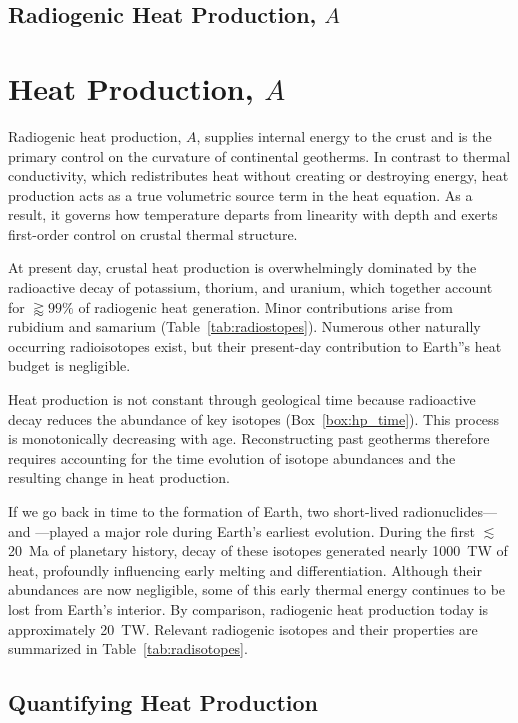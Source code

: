 \subsection{Radiogenic Heat Production, $A$}

\section{Heat Production, $A$}

Radiogenic heat production, $A$, supplies internal energy to the crust and is the primary control on the curvature of continental geotherms. In contrast to thermal conductivity, which redistributes heat without creating or destroying energy, heat production acts as a true volumetric source term in the heat equation. As a result, it governs how temperature departs from linearity with depth and exerts first-order control on crustal thermal structure.

At present day, crustal heat production is overwhelmingly dominated by the radioactive decay of potassium, thorium, and uranium, which together account for $\gtrapprox 99\%$ of radiogenic heat generation. Minor contributions arise from rubidium and samarium  (Table~\ref{tab:radiostopes}). Numerous other naturally occurring radioisotopes exist, but their present-day contribution to Earth''s heat budget is negligible.

Heat production is not constant through geological time because radioactive decay reduces the abundance of key isotopes (Box~\ref{box:hp_time}). This process is monotonically decreasing with age. Reconstructing past geotherms therefore requires accounting for the time evolution of isotope abundances and the resulting change in heat production.


If we go back in time to the formation of Earth, two short-lived radionuclides--- and ---played a major role during Earth's earliest evolution. During the first $\lesssim$20~Ma of planetary history, decay of these isotopes generated nearly \SI{1000}{TW} of heat, profoundly influencing early melting and differentiation. Although their abundances are now negligible, some of this early thermal energy continues to be lost from Earth's interior. By comparison, radiogenic heat production today is approximately \SI{20}{TW}. Relevant radiogenic isotopes and their properties are summarized in Table~\ref{tab:radisotopes}.

\subsection{Quantifying Heat Production}

